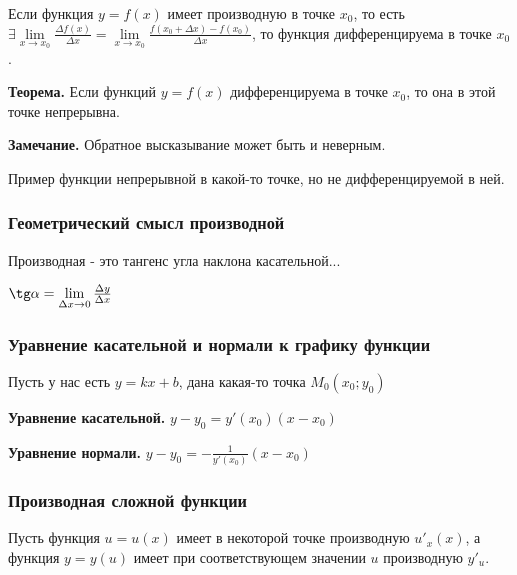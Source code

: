 \documentclass{article}
\begin{document}
\begin{flushleft}
Если функция $y = f(x)$ имеет производную в точке $x_0$, то есть $\exists \lim\limits_{x \to x_0} \frac{\Delta f(x)}{\Delta x} = \lim\limits_{x \to x_0} \frac{f(x_0 + \Delta x) - f(x_0)}{\Delta x}$, то функция дифференцируема в точке $x_0$.

\hfill

\textbf{Теорема.} Если функций $y = f(x)$ дифференцируема в точке $x_0$, то она в этой точке непрерывна.

\textbf{Замечание.} Обратное высказывание может быть и неверным.

\hfill

Пример функции непрерывной в какой-то точке, но не дифференцируемой в ней.


\subsubsection{Геометрический смысл производной}

Производная - это тангенс угла наклона касательной...

$\tg \alpha = \lim\limits_{\Delta x \to 0} \frac{\Delta y}{\Delta x}$

\subsubsection{Уравнение касательной и нормали к графику функции}

Пусть у нас есть $y = kx + b$, дана какая-то точка $M_0(x_0; y_0)$

\hfill

\textbf{Уравнение касательной.} $y - y_0 = y'(x_0)(x - x_0)$

\hfill

\textbf{Уравнение нормали.} $y - y_0 = -\frac{1}{y'(x_0)} (x - x_0)$

\subsubsection{Производная сложной функции}

Пусть функция $u = u(x)$ имеет в некоторой точке производную $u'_x(x)$, а функция $y = y(u)$ имеет при соответствующем значении $u$ производную $y'_u$.


\end{flushleft}
\end{document}
